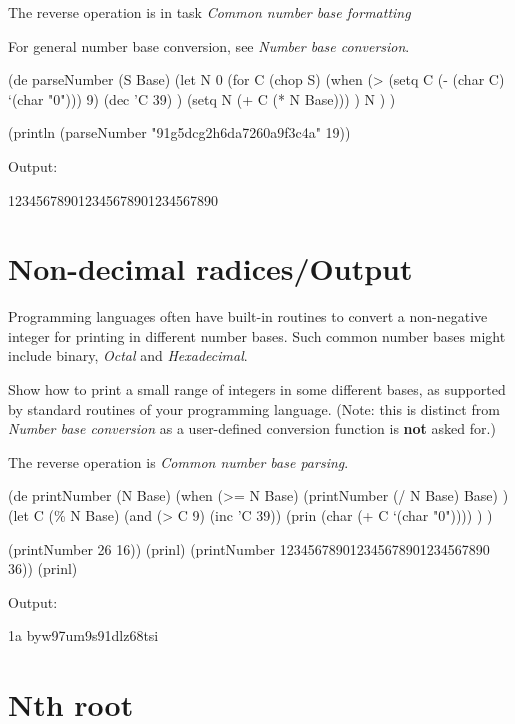 The reverse operation is in task \emph{Common number base formatting}

For general number base conversion, see \emph{Number base conversion}.


\begin{wideverbatim}

(de parseNumber (S Base)
   (let N 0
      (for C (chop S)
         (when (> (setq C (- (char C) `(char "0"))) 9)
            (dec 'C 39) )
         (setq N (+ C (* N Base))) )
      N ) )

(println (parseNumber "91g5dcg2h6da7260a9f3c4a" 19))

Output:

123456789012345678901234567890

\end{wideverbatim}

\pagebreak{}
\section*{Non-decimal radices/Output}

Programming languages often have built-in routines to convert a
non-negative integer for printing in different number bases. Such common
number bases might include binary, \emph{Octal} and
\emph{Hexadecimal}.

Show how to print a small range of integers in some different bases, as
supported by standard routines of your programming language. (Note: this
is distinct from \emph{Number base
conversion} as a user-defined conversion function is \textbf{not} asked
for.)

The reverse operation is
\emph{Common number base parsing}.


\begin{wideverbatim}

(de printNumber (N Base)
   (when (>= N Base)
      (printNumber (/ N Base) Base) )
   (let C (\% N Base)
      (and (> C 9) (inc 'C 39))
      (prin (char (+ C `(char "0")))) ) )

(printNumber 26 16))
(prinl)
(printNumber 123456789012345678901234567890 36))
(prinl)

Output:

1a
byw97um9s91dlz68tsi

\end{wideverbatim}

\pagebreak{}
\section*{Nth root}

